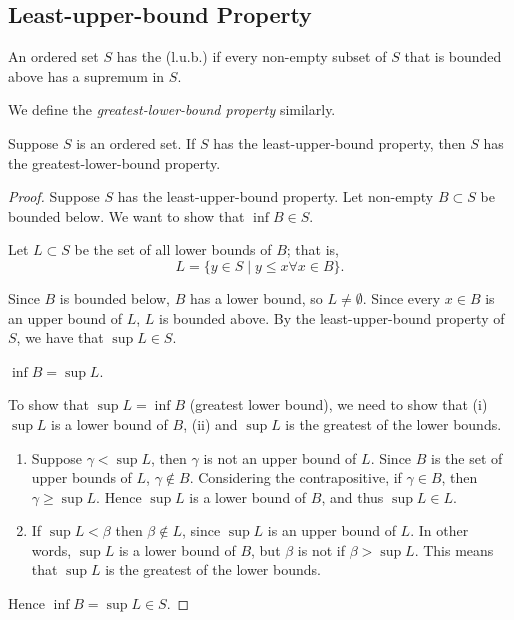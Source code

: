\subsection{Least-upper-bound Property}
\begin{definition}
An ordered set $S$ has the  (l.u.b.) if every non-empty subset of $S$ that is bounded above has a supremum in $S$.

We define the \emph{greatest-lower-bound property} similarly.
\end{definition}

\begin{proposition}
Suppose $S$ is an ordered set. If $S$ has the least-upper-bound property, then $S$ has the greatest-lower-bound property.
\end{proposition}

\begin{proof}
Suppose $S$ has the least-upper-bound property. Let non-empty $B\subset S$ be bounded below. We want to show that $\inf B\in S$.

Let $L\subset S$ be the set of all lower bounds of $B$; that is,
\[L=\{y\in S\mid y\le x\forall x\in B\}.\]

Since $B$ is bounded below, $B$ has a lower bound, so $L\neq\emptyset$. Since every $x\in B$ is an upper bound of $L$, $L$ is bounded above. By the least-upper-bound property of $S$, we have that $\sup L\in S$.

\begin{claim}
$\inf B=\sup L$.
\end{claim}

To show that $\sup L=\inf B$ (greatest lower bound), we need to show that (i) $\sup L$ is a lower bound of $B$, (ii) and $\sup L$ is the greatest of the lower bounds.
\begin{enumerate}[label=(\roman*)]
\item Suppose $\gamma<\sup L$, then $\gamma$ is not an upper bound of $L$. Since $B$ is the set of upper bounds of $L$, $\gamma\notin B$. Considering the contrapositive, if $\gamma\in B$, then $\gamma\ge\sup L$. Hence $\sup L$ is a lower bound of $B$, and thus $\sup L\in L$.
\item If $\sup L<\beta$ then $\beta\notin L$, since $\sup L$ is an upper bound of $L$. In other words, $\sup L$ is a lower bound of $B$, but $\beta$ is not if $\beta>\sup L$. This means that $\sup L$ is the greatest of the lower bounds.
\end{enumerate}
Hence $\inf B=\sup L\in S$.
\end{proof}


